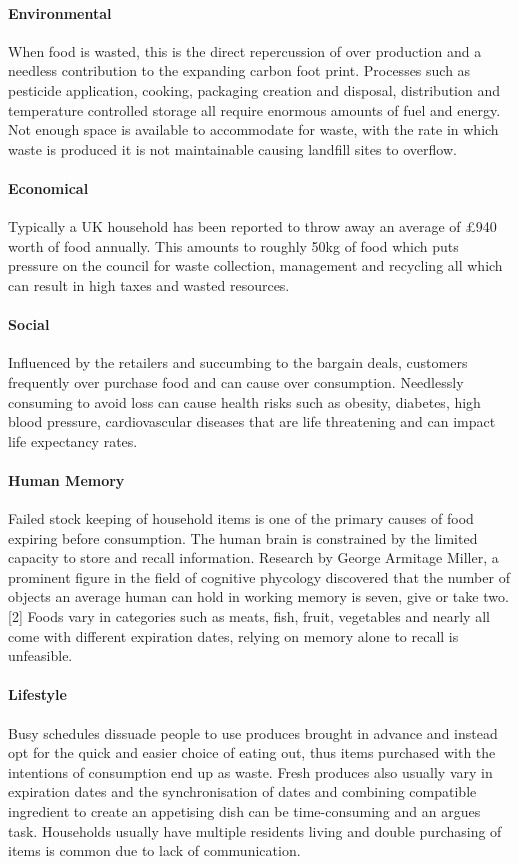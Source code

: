 \documentclass[a4paper, 11pt]{article}
\begin{document}
\paragraph{Environmental} When food is wasted, this is the direct repercussion of over production and a needless contribution to the expanding carbon foot print. Processes such as pesticide application, cooking, packaging creation and disposal, distribution and temperature controlled storage all require enormous amounts of fuel and energy. Not enough space is available to accommodate for waste, with the rate in which waste is produced it is not maintainable causing landfill sites to overflow.

\paragraph{Economical} Typically a UK household has been reported to throw away an average of \pounds940 worth of food annually. This amounts to roughly 50kg of food which puts pressure on the council for waste collection, management and recycling all which can result in high taxes and wasted resources. 

\paragraph{Social} Influenced by the retailers and succumbing to the bargain deals, customers frequently over purchase food and can cause over consumption. Needlessly consuming to avoid loss can cause health risks such as obesity, diabetes, high blood pressure, cardiovascular diseases that are life threatening and can impact life expectancy rates. 

\paragraph{Human Memory} Failed stock keeping of household items is one of the primary causes of food expiring before consumption. The human brain is constrained by the limited capacity to store and recall information. Research by George Armitage Miller, a prominent figure in the field of cognitive phycology discovered that the number of objects an average human can hold in working memory is seven, give or take two.[2] Foods vary in categories such as meats, fish, fruit, vegetables and nearly all come with different expiration dates, relying on memory alone to recall is unfeasible. 

\paragraph{Lifestyle} Busy schedules dissuade people to use produces brought in advance and instead opt for the quick and easier choice of eating out, thus items purchased with the intentions of consumption end up as waste. Fresh produces also usually vary in expiration dates and the synchronisation of dates and combining compatible ingredient to create an appetising dish can be time-consuming and an argues task. Households usually have multiple residents living and double purchasing of items is common due to lack of communication. 
\end{document}
